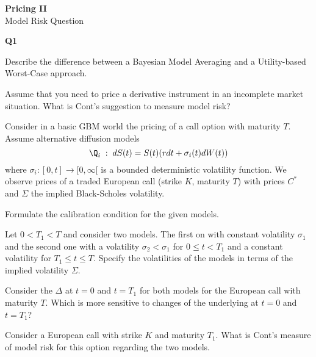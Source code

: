 \documentclass[11pt,a4paper,titlepage]{article}
\begin{document}
\setlength{\topmargin}{-2.5cm}

\begin{center} {\LARGE \bf Pricing II } \\[5mm]
                {\large Model Risk Question }
\end{center}

\vspace{0.3cm}

\pagestyle{empty}



\vspace{0.3cm}

\item[]{\bf Q1}

\item[(a)]
Describe the difference between a Bayesian Model Averaging and a Utility-based Worst-Case
approach.
\item[(b)] Assume that you need to price a derivative instrument in an incomplete market situation. What is Cont's suggestion to measure model risk?
\item[(c)]
Consider in a basic GBM world the pricing of a call option with maturity $T$.
Assume alternative diffusion models
\begin{equation}
\Q_i\;:\; dS(t) = S(t)(r dt + \sigma_i(t) dW(t))
\end{equation}
where $ \sigma_i: [0,t] \rightarrow [0, \infty[ $ is a bounded deterministic volatility function.
We observe prices of a traded European call (strike $K$, maturity $T$) with prices $C^*$ and
$\Sigma$ the implied Black-Scholes volatility.
\item[(i)]
Formulate the calibration condition for the given models.
\item[(ii)]
Let $0< T_1 <T$ and consider two models. The first on with constant volatility $\sigma_1$ and the second one with a volatility $\sigma_2 < \sigma _1$ for $0 \leq t <T_1$ and a constant volatility for $T_1\leq t \leq T$. Specify  the  volatilities of the models in terms of the implied volatility $\Sigma $.
\item[(iii)]
Consider the $\Delta$ at $t=0$ and $t=T_1$ for both models for the European call with maturity $T$. Which is more sensitive to changes of the underlying at $t=0$ and $t=T_1$?
\item[(iv)]
Consider  a  European call with strike $K$ and maturity $T_1$. What is Cont's measure of model risk for this option regarding the two models.
\end{document}
